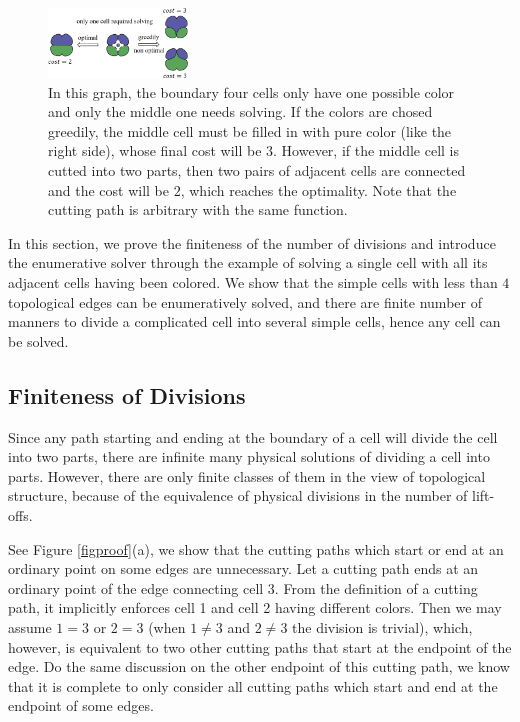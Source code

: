 \documentclass[journal]{IEEEtran}
\begin{document}
\begin{figure}[t]
\centering
\includegraphics[width = 0.33\textwidth]{simple_example/simple}
\caption{In this graph, the boundary four cells only have one possible color and only the middle one needs solving. 
If the colors are chosed greedily, the middle cell must be filled in with pure color (like the right side), whose final cost will be $3$. However, if the middle cell is cutted into two parts, then two pairs of adjacent cells are connected and the cost will be $2$, which reaches the optimality. Note that the cutting path is arbitrary with the same function.}\label{figsimpleexample}
\end{figure}


In this section, we prove the finiteness of the number of divisions and introduce the enumerative solver through the example of solving a single cell with all its adjacent cells having been colored. We show that the simple cells with less than $4$ topological edges can be enumeratively solved, and there are finite number of manners to divide a complicated cell into several simple cells, hence any cell can be solved. 

\subsection{Finiteness of Divisions}\label{subsectionproof}
Since any path starting and ending at the boundary of a cell will divide the cell into two parts, there are infinite many physical solutions of dividing a cell into parts. However, there are only finite classes of them in the view of topological structure, because of the equivalence of physical divisions in the number of lift-offs. 

See Figure \ref{figproof}(a), we show that the cutting paths which start or end at an ordinary point on some edges are unnecessary. 
Let a cutting path ends at an ordinary point of the edge connecting cell 3. From the definition of a cutting path, it implicitly enforces cell 1 and cell 2 having different colors. Then we may assume $1=3$ or $2=3$ (when $1\neq 3$ and $2\neq 3$ the division is trivial), which, however, is equivalent to two other cutting paths that start at the endpoint of the edge. Do the same discussion on the other endpoint of this cutting path, we know that it is complete to only consider all cutting paths which start and end at the endpoint of some edges.  
\end{document}
